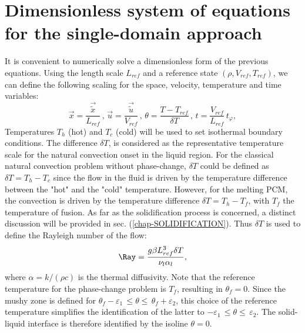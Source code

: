 \section{Dimensionless system of equations for the single-domain approach}\label{sec-eq-scaling}

It is convenient to numerically solve a dimensionless form of the previous equations.
Using the length scale $L_{ref}$ and a reference state $(\rho, V_{ref}, T_{ref})$, we can define the following scaling for the space, velocity, temperature and time variables:
\begin{equation}\label{eq-adim}
\vec{x} = \frac{\vec{\tilde{x}}}{L_{ref}} \, , \,  \vec{u} = \frac{\vec{\tilde{u}}}{V_{ref}} \, , \,  \theta = \frac{T-T_{ref}}{\delta T} \, , \,  t = \frac{V_{ref}}{L_{ref}} \, t_{\varphi},
\end{equation}
Temperatures $T_h$ (hot) and $T_c$ (cold) will be used to set isothermal boundary conditions. The difference $\delta T$, 
is considered as the representative temperature scale  for the natural convection onset in the liquid region. 
For the classical natural convection problem without phase-change, $\delta T$ could be defined as $\delta T=T_{h}-T_{c}$ since the flow in the fluid is driven by the temperature difference between the "hot" and the "cold" temperature.
However, for the melting PCM, the convection is driven by the temperature difference $\delta T=T_{h}-T_{f}$, with $T_f$ the temperature of fusion.
As far as the solidification process is concerned, a distinct discussion will be provided in sec. (\ref{chap-SOLIDIFICATION}). %
Thus $\delta T$ is used to define the Rayleigh number of the flow:
\begin{equation}
\label{eq-Rayleigh}
\Ray = \frac{g \beta L_{ref}^3 \delta T}{\nu_l \alpha_l},
\end{equation}
where $\alpha = k/(\rho c)$ is the thermal diffusivity. 
Note that the reference temperature for the phase-change problem is   $T_f$, resulting in  $\theta_f = 0$.
Since the mushy zone is defined for  $  \theta_f - \varepsilon_1 \, \leq \theta \leq \, \theta_f + \varepsilon_2 $, this choice of the reference temperature 
simplifies the identification of the latter to  $  -\varepsilon_1 \, \leq \theta \leq \,\varepsilon_2 $.
The solid-liquid interface is therefore identified by the isoline $\theta=0$.

